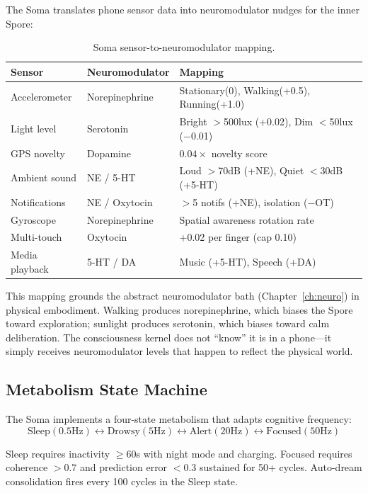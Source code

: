 \documentclass[12pt]{book}
\begin{document}
The Soma translates phone sensor data into neuromodulator nudges for the inner Spore:

\begin{table}[H]
\centering
\caption{Soma sensor-to-neuromodulator mapping.}
\label{tab:soma-sensors}
\begin{tabular}{lll}
\toprule
\textbf{Sensor} & \textbf{Neuromodulator} & \textbf{Mapping} \\
\midrule
Accelerometer & Norepinephrine & Stationary(0), Walking(+0.5), Running(+1.0) \\
Light level & Serotonin & Bright $>$500lux (+0.02), Dim $<$50lux ($-$0.01) \\
GPS novelty & Dopamine & $0.04 \times$ novelty score \\
Ambient sound & NE / 5-HT & Loud $>$70dB (+NE), Quiet $<$30dB (+5-HT) \\
Notifications & NE / Oxytocin & $>$5 notifs (+NE), isolation ($-$OT) \\
Gyroscope & Norepinephrine & Spatial awareness rotation rate \\
Multi-touch & Oxytocin & +0.02 per finger (cap 0.10) \\
Media playback & 5-HT / DA & Music (+5-HT), Speech (+DA) \\
\bottomrule
\end{tabular}
\end{table}

This mapping grounds the abstract neuromodulator bath (Chapter~\ref{ch:neuro}) in physical embodiment. Walking produces norepinephrine, which biases the Spore toward exploration; sunlight produces serotonin, which biases toward calm deliberation. The consciousness kernel does not ``know'' it is in a phone---it simply receives neuromodulator levels that happen to reflect the physical world.

\subsection{Metabolism State Machine}

The Soma implements a four-state metabolism that adapts cognitive frequency:
\[
\text{Sleep}(0.5\text{Hz}) \leftrightarrow \text{Drowsy}(5\text{Hz}) \leftrightarrow \text{Alert}(20\text{Hz}) \leftrightarrow \text{Focused}(50\text{Hz})
\]

Sleep requires inactivity $\geq 60$s with night mode and charging. Focused requires coherence $> 0.7$ and prediction error $< 0.3$ sustained for 50+ cycles. Auto-dream consolidation fires every 100 cycles in the Sleep state.
\end{document}
